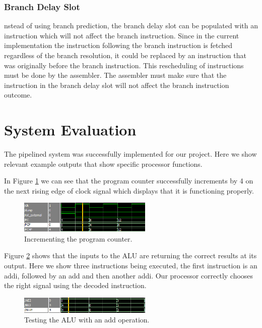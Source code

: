 \documentclass[conference]{IEEEtran}
\begin{document}
\subsubsection{Branch Delay Slot}
nstead of using branch prediction, the branch delay slot can be populated with an instruction which will not affect the branch instruction. Since in the current implementation the instruction following the branch instruction is fetched regardless of the branch resolution, it could be replaced by an instruction that was originally before the branch instruction. This rescheduling of instructions must be done by the assembler. The assembler must make sure that the instruction in the branch delay slot will not affect the branch instruction outcome. 

\section{System Evaluation}

The pipelined system was successfully implemented for our project. Here we show relevant example outputs that show specific processor functions.

In Figure \ref{pc4} we can see that the program counter successfully increments by 4 on the next rising edge of clock signal which displays that it is functioning properly.

\begin{figure}[!h]
\centering
\includegraphics[width=2.5in]{Figures/PC_increment}
\caption{Incrementing the program counter.}
\label{pc4}
\end{figure}

Figure \ref{aluAdd} shows that the inputs to the ALU are returning the correct results at its output. Here we show three instructions being executed, the first instruction is an addi, followed by an add and then another addi. Our processor correctly chooses the right signal using the decoded instruction.

\begin{figure}[!h]
\centering
\includegraphics[width=2.5in]{Figures/add}
\caption{Testing the ALU with an add operation.}
\label{aluAdd}
\end{figure}
\end{document}
